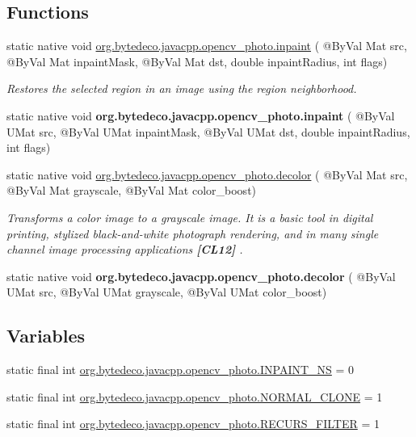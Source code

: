 \subsection*{Functions}
\begin{DoxyCompactItemize}
\item 
static native void \hyperlink{group__photo_gac642f4ae1eabdce5624c07d7202b0a3e}{org.\+bytedeco.\+javacpp.\+opencv\+\_\+photo.\+inpaint} ( @By\+Val Mat src, @By\+Val Mat inpaint\+Mask, @By\+Val Mat dst, double inpaint\+Radius, int flags)
\begin{DoxyCompactList}\small\item\em Restores the selected region in an image using the region neighborhood. \end{DoxyCompactList}\item 
\mbox{\label{group__photo_ga8802d056cb4a40bf23321815e1a47d7a}} 
static native void {\bfseries org.\+bytedeco.\+javacpp.\+opencv\+\_\+photo.\+inpaint} ( @By\+Val U\+Mat src, @By\+Val U\+Mat inpaint\+Mask, @By\+Val U\+Mat dst, double inpaint\+Radius, int flags)
\item 
static native void \hyperlink{group__photo_ga51c7b45dade866b4280660a0a0842dbc}{org.\+bytedeco.\+javacpp.\+opencv\+\_\+photo.\+decolor} ( @By\+Val Mat src, @By\+Val Mat grayscale, @By\+Val Mat color\+\_\+boost)
\begin{DoxyCompactList}\small\item\em Transforms a color image to a grayscale image. It is a basic tool in digital printing, stylized black-\/and-\/white photograph rendering, and in many single channel image processing applications {\bfseries [C\+L12]} . \end{DoxyCompactList}\item 
\mbox{\label{group__photo_ga736e24715f8889ca19d423760267140b}} 
static native void {\bfseries org.\+bytedeco.\+javacpp.\+opencv\+\_\+photo.\+decolor} ( @By\+Val U\+Mat src, @By\+Val U\+Mat grayscale, @By\+Val U\+Mat color\+\_\+boost)
\end{DoxyCompactItemize}
\subsection*{Variables}
\begin{DoxyCompactItemize}
\item 
static final int \hyperlink{group__photo_ga81c9fcd4663cdb43a1f8d9a782e57903}{org.\+bytedeco.\+javacpp.\+opencv\+\_\+photo.\+I\+N\+P\+A\+I\+N\+T\+\_\+\+NS} = 0
\item 
static final int \hyperlink{group__photo_ga4e82340ea44373f9457dac4bd64bbf85}{org.\+bytedeco.\+javacpp.\+opencv\+\_\+photo.\+N\+O\+R\+M\+A\+L\+\_\+\+C\+L\+O\+NE} = 1
\item 
static final int \hyperlink{group__photo_ga560c840660db719eb465b520ad603a00}{org.\+bytedeco.\+javacpp.\+opencv\+\_\+photo.\+R\+E\+C\+U\+R\+S\+\_\+\+F\+I\+L\+T\+ER} = 1
\end{DoxyCompactItemize}



